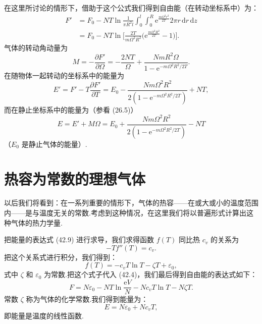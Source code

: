 \begin{xiti}
在这里所讨论的情形下，借助于这个公式我们得到自由能（在转动坐标系中）为：
\begin{equation*}
\begin{aligned}
  F'&=F_0-NT\ln\frac{1}{\pi R^2l}\int_0^l\int_0^R
  \mathrm{e}^{\frac{m\Omega^2r^2}{2T}}2\pi r\,\mathrm{d}r\,\mathrm{d}z\\
  &=F_0-NT\ln\Big[\frac{2T}{m\Omega^2R^2}
  \big(\mathrm{e}^{\frac{m\Omega^2R^2}{2T}}-1\big)\Big].
\end{aligned}
\end{equation*}
气体的转动角动量为
\begin{equation*}
  M=-\frac{\partial F'}{\partial\Omega}
  =-\frac{2NT}{\Omega}
  +\frac{NmR^2\Omega}{1-\mathrm{e}^{-m\Omega^2R^2/2T}}.
\end{equation*}
在随物体一起转动的坐标系中的能量为
\begin{equation*}
  E'=F'-T\frac{\partial F'}{\partial T}
  =E_0-\frac{Nm\Omega^2R^2}{2\left(1-\mathrm{e}^{-m\Omega^2R^2/2T}\right)}+NT,
\end{equation*}
而在静止坐标系中的能量为（参看 (26.5)）
\begin{equation*}
  E=E'+M\Omega
  =E_0+\frac{Nm\Omega^2R^2}{2\left(1-\mathrm{e}^{-m\Omega^2R^2/2T}\right)}-NT
\end{equation*}
（$E_0$ 是静止气体的能量）.

\end{xiti}

\section{热容为常数的理想气体}

以后我们将看到：在一系列重要的情形下，气体的热容——在或大或小的温度范围内——是与温度无关的常数.考虑到这种情况，在这里我们将以普遍形式计算出这种气体的热力学量.

把能量的表达式 (42.9) 进行求导，我们求得函数 $f(T)$ 同比热 $c_v$ 的关系为
\begin{equation*}
  -Tf''(T)=c_v.
\end{equation*}
把这个关系式进行积分，我们得到：
\begin{equation*}
  f(T)=-c_vT\ln T-\zeta T+\varepsilon_0,
\end{equation*}
式中 $\zeta$ 和 $\varepsilon_0$ 为常数.把这个式子代入 (42.4)，我们最后得到自由能的表达式如下：
\begin{equation}
  F=N\varepsilon_0-NT\ln\frac{\mathrm{e}V}{N}
  -Nc_vT\ln T-N\zeta T.
\end{equation}
常数 $\zeta$ 称为气体的化学常数.我们得到能量为：
\begin{equation}
  E=N\varepsilon_0+Nc_vT,
\end{equation}
即能量是温度的线性函数.

